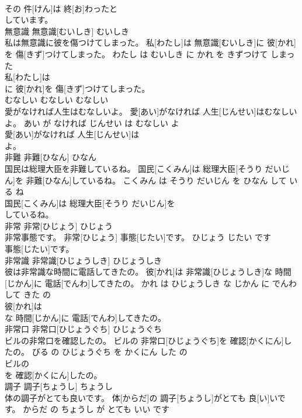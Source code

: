\documentclass[8pt]{extreport}
\begin{document}
\begin{CJK}{UTF8}{min}
\\	その 件[けん]は 終[お]わったと
\\	しています。			
\\	無意識	無意識[むいしき]	むいしき	
\\	私は無意識に彼を傷つけてしまった。	私[わたし]は 無意識[むいしき]に 彼[かれ]を 傷[きず]つけてしまった。	わたし は むいしき に かれ を きずつけて しまった	
\\	私[わたし]は
\\	に 彼[かれ]を 傷[きず]つけてしまった。			
\\	むなしい	むなしい	むなしい	
\\	愛がなければ人生はむなしいよ。	愛[あい]がなければ 人生[じんせい]はむなしいよ。	あい が なければ じんせい は むなしい よ	
\\	愛[あい]がなければ 人生[じんせい]は
\\	よ。			
\\	非難	非難[ひなん]	ひなん	
\\	国民は総理大臣を非難しているね。	国民[こくみん]は 総理大臣[そうり だいじん]を 非難[ひなん]しているね。	こくみん は そうり だいじん を ひなん して いる ね	
\\	国民[こくみん]は 総理大臣[そうり だいじん]を
\\	しているね。			
\\	非常	非常[ひじょう]	ひじょう	
\\	非常事態です。	非常[ひじょう] 事態[じたい]です。	ひじょう じたい です	
\\	事態[じたい]です。			
\\	非常識	非常識[ひじょうしき]	ひじょうしき	
\\	彼は非常識な時間に電話してきたの。	彼[かれ]は 非常識[ひじょうしき]な 時間[じかん]に 電話[でんわ]してきたの。	かれ は ひじょうしき な じかん に でんわ して きた の	
\\	彼[かれ]は
\\	な 時間[じかん]に 電話[でんわ]してきたの。			
\\	非常口	非常口[ひじょうぐち]	ひじょうぐち	
\\	ビルの非常口を確認したの。	ビルの 非常口[ひじょうぐち]を 確認[かくにん]したの。	びる の ひじょうぐち を かくにん した の	
\\	ビルの
\\	を 確認[かくにん]したの。			
\\	調子	調子[ちょうし]	ちょうし	
\\	体の調子がとても良いです。	体[からだ]の 調子[ちょうし]がとても 良[い]いです。	からだ の ちょうし が とても いい です	

\end{CJK}
\end{document}
